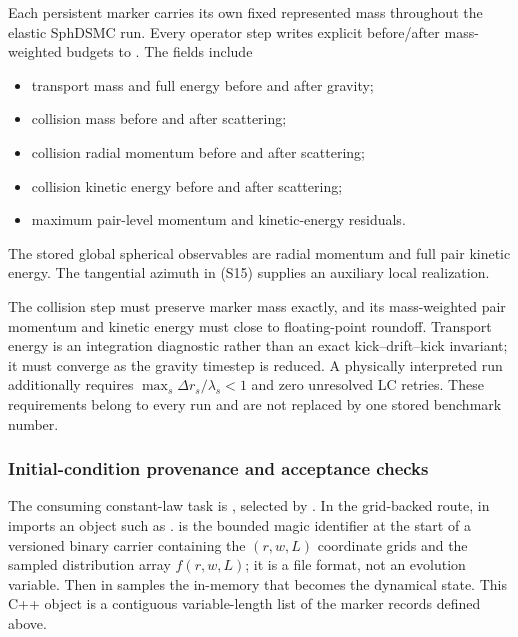 Each persistent marker carries its own fixed represented mass throughout the
elastic SphDSMC run.  Every operator step writes explicit before/after
mass-weighted budgets to
.  The fields include
\begin{itemize}[itemsep=0.25em]
\item transport mass and full energy before and after gravity;

\item collision mass before and after scattering;

\item collision radial momentum before and after scattering;

\item collision kinetic energy before and after scattering;

\item maximum pair-level momentum and kinetic-energy residuals.
\end{itemize}
The stored global spherical observables are radial momentum and full pair
kinetic energy.  The tangential azimuth in (S15) supplies an auxiliary local
realization.

The collision step must preserve marker mass exactly, and its mass-weighted
pair momentum and kinetic energy must close to floating-point roundoff.
Transport energy is an integration diagnostic rather than an exact
kick--drift--kick invariant; it must converge as the gravity timestep is
reduced.  A physically interpreted run additionally requires
\(\max_s\Delta r_s/\lambda_s<1\) and zero unresolved LC retries.  These
requirements belong to every run and are not replaced by one stored benchmark
number.

\subsubsection{Initial-condition provenance and acceptance checks}

The consuming constant-law task is
, selected by
.  In the grid-backed route,
 in  imports
an  object such as
.
 is the bounded magic identifier at the start of a versioned
binary carrier containing the \((r,w,L)\) coordinate grids and the sampled
distribution array \(f(r,w,L)\); it is a file format, not an evolution
variable.  Then  in
 samples the in-memory
 that becomes the dynamical state.
This C++ object is a contiguous variable-length list of the marker records
defined above.

